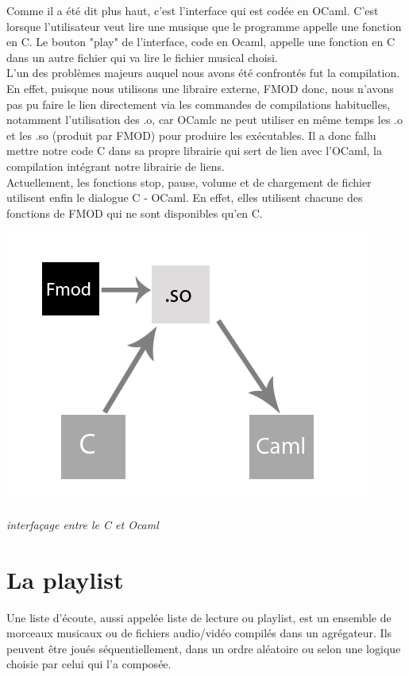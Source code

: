 \documentclass[12pt,a4paper]{report}
\begin{document}
Comme il a été dit plus haut, c'est l'interface qui est codée en OCaml. C'est lorsque l'utilisateur veut lire une musique que le programme appelle une fonction en C. Le bouton "play" de l'interface, code en Ocaml, appelle une fonction en C dans un autre fichier qui va lire le fichier musical choisi.\\

L'un des problèmes majeurs auquel nous avons été confrontés fut la compilation. En effet, puisque nous utilisons une libraire externe, FMOD donc, nous n'avons pas pu faire le lien directement via les commandes de compilations habituelles, notamment l'utilisation des .o, car OCamlc ne peut utiliser en même temps les .o et les .so (produit par FMOD) pour produire les exécutables. Il a donc fallu mettre notre code C dans sa propre librairie qui sert de lien avec l'OCaml, la compilation intégrant notre librairie de liens.\\

Actuellement, les fonctions stop, pause, volume et de chargement de fichier utilisent enfin le dialogue C - OCaml. En effet, elles utilisent chacune des fonctions de FMOD qui ne sont disponibles qu'en C.

\begin{center}
\includegraphics[scale=0.7]{c_caml.jpg}

\it{interfaçage entre le C et Ocaml}
\end{center}


\chapter{La playlist}

Une liste d'écoute, aussi appelée liste de lecture ou playlist, est un ensemble de morceaux musicaux ou de fichiers audio/vidéo compilés dans un agrégateur. Ils peuvent être joués séquentiellement, dans un ordre aléatoire ou selon une logique choisie par celui qui l'a composée.
\end{document}
